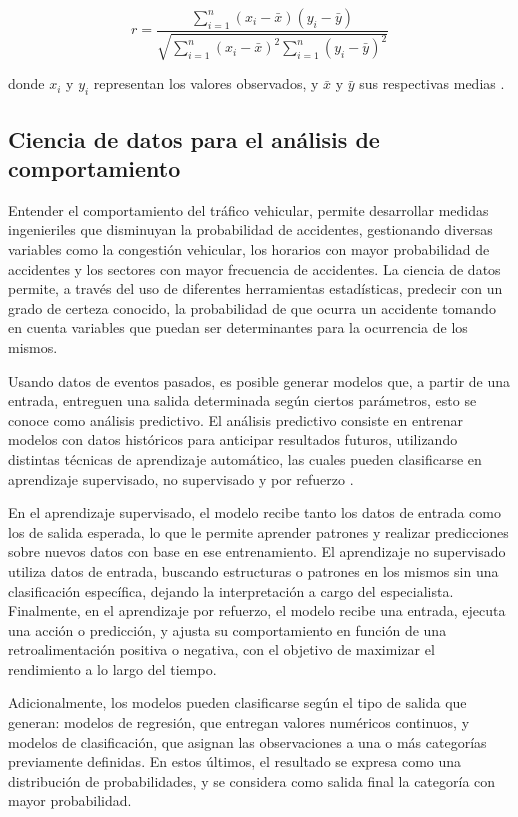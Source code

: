 \documentclass[12pt]{article}
\begin{document}
\begin{equation}
r = \frac{\sum_{i=1}^{n}(x_i - \bar{x})(y_i - \bar{y})}{\sqrt{\sum_{i=1}^{n}(x_i - \bar{x})^2 \sum_{i=1}^{n}(y_i - \bar{y})^2}}
\end{equation}

donde \( x_i \) y \( y_i \) representan los valores observados, y \( \bar{x} \) y \( \bar{y} \) sus respectivas medias \citep{montgomery2012}.

\subsection{Ciencia de datos para el análisis de comportamiento}

Entender el comportamiento del tráfico vehicular, permite desarrollar medidas ingenieriles que disminuyan la probabilidad de accidentes, gestionando diversas variables como la congestión vehicular, los horarios con mayor probabilidad de accidentes y los sectores con mayor frecuencia de accidentes. La ciencia de datos permite, a través del uso de diferentes herramientas estadísticas, predecir con un grado de certeza conocido, la probabilidad de que ocurra un accidente tomando en cuenta variables que puedan ser determinantes para la ocurrencia de los mismos.

Usando datos de eventos pasados, es posible generar modelos que, a partir de una entrada, entreguen una salida determinada según ciertos parámetros, esto se conoce como análisis predictivo. El análisis predictivo consiste en entrenar modelos con datos históricos para anticipar resultados futuros, utilizando distintas técnicas de aprendizaje automático, las cuales pueden clasificarse en aprendizaje supervisado, no supervisado y por refuerzo \citep{murphy2012machine, geron2019hands, bishop2006pattern}.

En el aprendizaje supervisado, el modelo recibe tanto los datos de entrada como los de salida esperada, lo que le permite aprender patrones y realizar predicciones sobre nuevos datos con base en ese entrenamiento. El aprendizaje no supervisado utiliza datos de entrada, buscando estructuras o patrones en los mismos sin una clasificación específica, dejando la interpretación a cargo del especialista. Finalmente, en el aprendizaje por refuerzo, el modelo recibe una entrada, ejecuta una acción o predicción, y ajusta su comportamiento en función de una retroalimentación positiva o negativa, con el objetivo de maximizar el rendimiento a lo largo del tiempo.

Adicionalmente, los modelos pueden clasificarse según el tipo de salida que generan: modelos de regresión, que entregan valores numéricos continuos, y modelos de clasificación, que asignan las observaciones a una o más categorías previamente definidas. En estos últimos, el resultado se expresa como una distribución de probabilidades, y se considera como salida final la categoría con mayor probabilidad.
\end{document}
